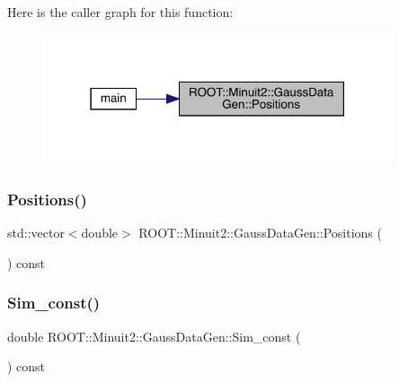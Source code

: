 Here is the caller graph for this function\+:
\nopagebreak
\begin{figure}[H]
\begin{center}
\leavevmode
\includegraphics[width=291pt]{d8/d75/classROOT_1_1Minuit2_1_1GaussDataGen_a1f8db2c19b438ac1665045a5737c1d62_icgraph}
\end{center}
\end{figure}
\mbox{\label{classROOT_1_1Minuit2_1_1GaussDataGen_a1f8db2c19b438ac1665045a5737c1d62}} 
\subsubsection{\texorpdfstring{Positions()}{Positions()}\hspace{0.1cm}{\footnotesize\ttfamily [2/2]}}
{\footnotesize\ttfamily std\+::vector$<$double$>$ R\+O\+O\+T\+::\+Minuit2\+::\+Gauss\+Data\+Gen\+::\+Positions (\begin{DoxyParamCaption}{ }\end{DoxyParamCaption}) const\hspace{0.3cm}{\ttfamily [inline]}}

\mbox{\label{classROOT_1_1Minuit2_1_1GaussDataGen_afa45bb0270f15866b588da8d8f56cfba}} 
\subsubsection{\texorpdfstring{Sim\_const()}{Sim\_const()}\hspace{0.1cm}{\footnotesize\ttfamily [1/2]}}
{\footnotesize\ttfamily double R\+O\+O\+T\+::\+Minuit2\+::\+Gauss\+Data\+Gen\+::\+Sim\+\_\+const (\begin{DoxyParamCaption}{ }\end{DoxyParamCaption}) const\hspace{0.3cm}{\ttfamily [inline]}}

